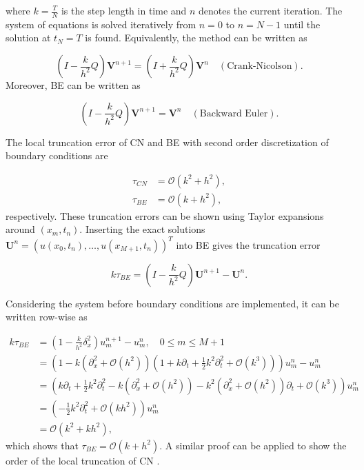 \noindent where $k=\frac{T}{N}$ is the step length in time and $n$ denotes the current iteration. The system of equations is solved iteratively from $n=0$ to $n=N-1$ until the solution at $t_N=T$ is found. Equivalently, the method can be written as

\begin{equation}
    (I - \frac{k}{h^2}Q)\boldsymbol{V}^{n+1} = (I + \frac{k}{h^2}Q)\boldsymbol{V}^n \quad (\text{Crank-Nicolson}).
    \label{CN}
\end{equation}
Moreover, BE can be written as

\begin{equation}
    (I - \frac{k}{h^2}Q)\boldsymbol{V}^{n+1} = \boldsymbol{V}^n \quad (\text{Backward Euler}).
    \label{BE}
\end{equation}

 \noindent The local truncation error of CN and BE with second order discretization of boundary conditions are

\begin{equation}
    \begin{split}
        \tau_{CN} &= \mathcal{O}(k^2 + h^2), \\
        \tau_{BE} &= \mathcal{O}(k + h^2),
    \end{split}
\label{orders}
\end{equation}
respectively. These truncation errors can be shown using Taylor expansions around $(x_m, t_n)$. Inserting the exact solutions $\boldsymbol{U}^n = (u(x_0,t_n), \dots, u(x_{M+1},t_n))^T$ into BE gives the truncation error

\begin{equation*}
    k\tau_{BE} = (I - \frac{k}{h^2}Q)\boldsymbol{U}^{n+1} - \boldsymbol{U}^n.
\end{equation*}

\noindent Considering the system before boundary conditions are implemented, it can be written row-wise as 

\begin{equation*}
\begin{split}
    k\tau_{BE} &= (1 - \frac{k}{h^2}\delta_x^2)u_m^{n+1} - u_m^n, \quad 0 \leq m \leq M + 1\\
    &= \left(1 - k(\partial_x^2 + \mathcal{O}(h^2))(1 + k\partial_t + \frac{1}{2}k^2\partial_t^2 + \mathcal{O}(k^3))\right)u_m^n - u_m^n \\
    &= \left(k\partial_t + \frac{1}{2}k^2\partial_t^2 - k(\partial_x^2 + \mathcal{O}(h^2)) - k^2(\partial_x^2 + \mathcal{O}(h^2))\partial_t + \mathcal{O}(k^3)\right)u_m^n \\
    &= \left(-\frac{1}{2}k^2\partial_t^2 + \mathcal{O}(kh^2)\right)u_m^n \\
    &= \mathcal{O}(k^2 + kh^2), 
\end{split}
\end{equation*}
which shows that $\tau_{BE} = \mathcal{O}(k + h^2)$. A similar proof can be applied to show the order of the local truncation of CN \cite{Owren}. 

